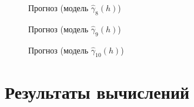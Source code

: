 \begin{figure}[H]
\caption{Прогноз (модель $ \widehat{\gamma}_8(h) $)}
\label{img:auto-class-26-pred}
\end{figure}

\begin{figure}[H]
\caption{Прогноз (модель $ \widehat{\gamma}_9(h) $)}
\label{img:auto-rob-5-pred}
\end{figure}

\begin{figure}[H]
\caption{Прогноз (модель $ \widehat{\gamma}_{10}(h) $)}
\label{img:auto-class-18-pred}
\end{figure}

\newpage
\section{ Результаты вычислений}
\label{c:app_results}


